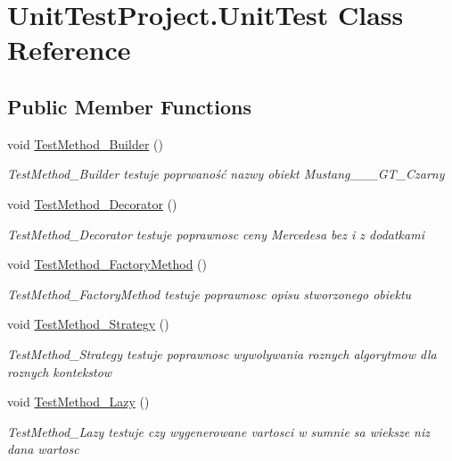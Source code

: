 \hypertarget{class_unit_test_project_1_1_unit_test}{}\section{Unit\+Test\+Project.\+Unit\+Test Class Reference}
\label{class_unit_test_project_1_1_unit_test}
\subsection*{Public Member Functions}
\begin{DoxyCompactItemize}
\item 
void \hyperlink{class_unit_test_project_1_1_unit_test_aec341db6b46970448b4beec991a18d75}{Test\+Method\+\_\+\+Builder} ()
\begin{DoxyCompactList}\small\item\em Test\+Method\+\_\+\+Builder testuje poprwaność nazwy obiekt Mustang\+\_\+\_\+\_\+\+G\+T\+\_\+\+Czarny \end{DoxyCompactList}\item 
void \hyperlink{class_unit_test_project_1_1_unit_test_a59f14a23f464d06ff18df31201cec4ac}{Test\+Method\+\_\+\+Decorator} ()
\begin{DoxyCompactList}\small\item\em Test\+Method\+\_\+\+Decorator testuje poprawnosc ceny Mercedesa bez i z dodatkami \end{DoxyCompactList}\item 
void \hyperlink{class_unit_test_project_1_1_unit_test_a8c7fc1163ab5311d719f7af9043391aa}{Test\+Method\+\_\+\+Factory\+Method} ()
\begin{DoxyCompactList}\small\item\em Test\+Method\+\_\+\+Factory\+Method testuje poprawnosc opisu stworzonego obiektu \end{DoxyCompactList}\item 
void \hyperlink{class_unit_test_project_1_1_unit_test_ab43f4fd2163eb134a7857cd72edae296}{Test\+Method\+\_\+\+Strategy} ()
\begin{DoxyCompactList}\small\item\em Test\+Method\+\_\+\+Strategy testuje poprawnosc wywolywania roznych algorytmow dla roznych kontekstow \end{DoxyCompactList}\item 
void \hyperlink{class_unit_test_project_1_1_unit_test_ac45373676e49f296a2b6d36b820aaf84}{Test\+Method\+\_\+\+Lazy} ()
\begin{DoxyCompactList}\small\item\em Test\+Method\+\_\+\+Lazy testuje czy wygenerowane vartosci w sumnie sa wieksze niz dana wartosc \end{DoxyCompactList}\end{DoxyCompactItemize}


